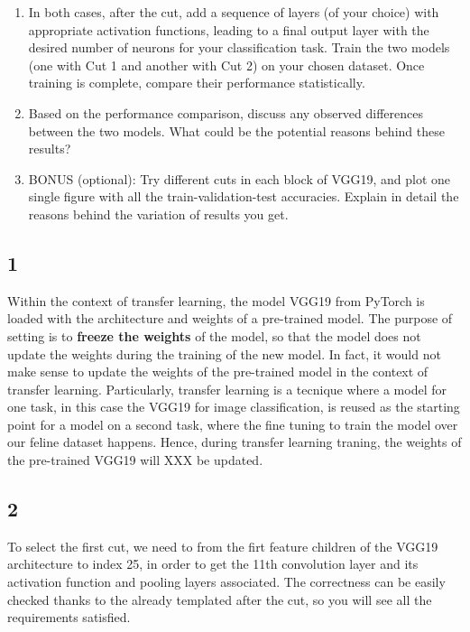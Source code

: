 \documentclass[11pt]{scrartcl}
\begin{document}
\begin{enumerate}
	\item In both cases, after the cut, add a sequence of layers (of your choice) 
	with appropriate activation functions, leading to a final output layer 
	with the desired number of neurons for your classification task.
	Train the two models (one with Cut 1 and another with Cut 2) on your chosen dataset. 
	Once training is complete, compare their performance statistically.

	\item Based on the performance comparison, 
	discuss any observed differences between the two models. 
	What could be the potential reasons behind these results?

	\item BONUS (optional): Try different cuts in each block of VGG19, 
	and plot one single figure with all the train-validation-test accuracies. 
	Explain in detail the reasons behind the variation of results you get.
\end{enumerate}


\subsection*{1}

Within the context of transfer learning, the model VGG19 from PyTorch 
is loaded with the architecture and weights of a pre-trained model.
The purpose of setting  
is to \textbf{freeze the weights} of the model,
so that the model does not update the weights during the training of the new model.
In fact, it would not make sense to update the weights of the pre-trained model
in the context of transfer learning.
Particularly, transfer learning is a tecnique where a model for one task,
in this case the VGG19 for image classification, 
is reused as the starting point for a model on a second task,
where the fine tuning to train the model over our feline dataset happens.
Hence, during transfer learning traning, 
the weights of the pre-trained VGG19 will XXX be updated.


\subsection*{2}

To select the first cut, we need to from the firt feature children of the 
VGG19 architecture to index 25, in order to get the 11th convolution layer 
and its activation function and pooling layers associated.
The correctness can be easily checked thanks to the already templated 
after the cut, so you will see all the requirements satisfied.
\end{document}
